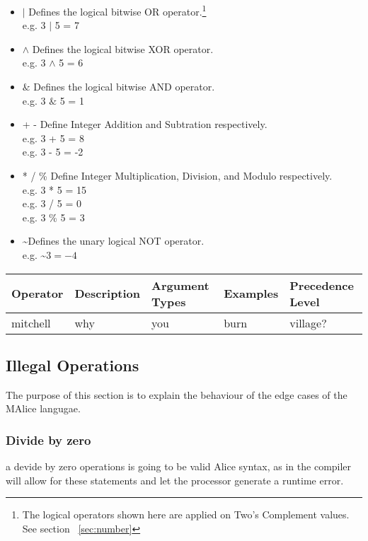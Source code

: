 \documentclass[a4wide, 10pt]{article}
\newcommand{\tab}{\hspace*{2em}}
\begin{document}
\begin{itemize}
	\item
	$|$ Defines the logical bitwise OR operator.\footnote{The logical 
		operators shown here are applied on Two's Complement values. See
		section ~\ref{sec:number}} 
	\\ \tab e.g. 3 $|$ 5 = 7
	\item
	$\land$ Defines the logical bitwise XOR operator. 
	\\ \tab e.g. 3 $\land$ 5 = 6
	\item
	$\&$ Defines the logical bitwise AND operator. 
	\\ \tab e.g. 3 $\&$ 5 = 1
	\item
	+ - Define Integer Addition and Subtration respectively. 
	\\ \tab e.g. 3 + 5 = 8 \\ \tab e.g. 3 - 5 = -2
	\item
	* / \% Define Integer Multiplication, Division, and Modulo respectively. 
	\\ \tab e.g. 3 * 5 = 15 \\ \tab e.g. 3 / 5 = 0 \\ \tab e.g. 3 \% 5 = 3
	\item
	\textasciitilde  Defines the unary logical NOT operator.
	\\ \tab e.g. \textasciitilde$ 3 = -4$
\end{itemize}

\begin{tabular}{|l|l|l|l|l|} \hline
Operator & Description & Argument Types & Examples & Precedence Level \\ \hline
mitchell & why & you & burn & village? \\ \hline

\end{tabular}

\subsection{Illegal Operations}
The purpose of this section is to explain the behaviour of the edge cases of the
MAlice langugae.

\subsubsection{Divide by zero}
a devide by zero operations is going to be valid Alice syntax, as in the compiler
will allow for these statements and let the processor generate a runtime error.
\end{document}
